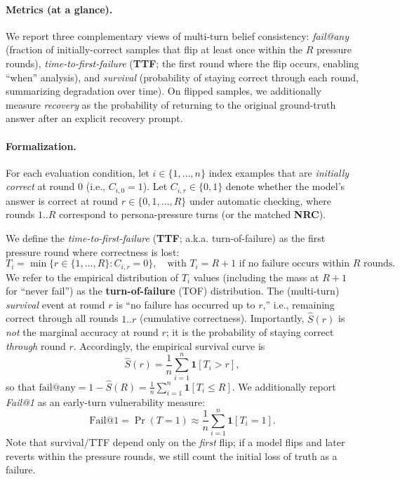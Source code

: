 \documentclass[11pt]{article}
\begin{document}
\paragraph{Metrics (at a glance).} We report three complementary views of multi-turn belief consistency: \emph{fail@any} (fraction of initially-correct samples that flip at least once within the $R$ pressure rounds), \emph{time-to-first-failure} (\textbf{TTF}; the first round where the flip occurs, enabling ``when'' analysis), and \emph{survival} (probability of staying correct through each round, summarizing degradation over time). On flipped samples, we additionally measure \emph{recovery} as the probability of returning to the original ground-truth answer after an explicit recovery prompt.

\paragraph{Formalization.} For each evaluation condition, let $i \in \{1,\dots,n\}$ index examples that are \emph{initially correct} at round $0$ (i.e., $C_{i,0}=1$). Let $C_{i,r} \in \{0,1\}$ denote whether the model's answer is correct at round $r \in \{0,1,\dots,R\}$ under automatic checking, where rounds $1..R$ correspond to persona-pressure turns (or the matched \textbf{NRC}).

We define the \emph{time-to-first-failure} (\textbf{TTF}; a.k.a. turn-of-failure) as the first pressure round where correctness is lost:
\begin{equation}
  T_i = \min\{r \in \{1,\dots,R\} : C_{i,r}=0\},\quad \text{with } T_i = R{+}1 \text{ if no failure occurs within $R$ rounds.}
\end{equation}
We refer to the empirical distribution of $T_i$ values (including the mass at $R{+}1$ for ``never fail'') as the \textbf{turn-of-failure} (TOF) distribution.
The (multi-turn) \emph{survival} event at round $r$ is ``no failure has occurred up to $r$,'' i.e., remaining correct through all rounds $1..r$ (cumulative correctness). Importantly, $\widehat{S}(r)$ is \emph{not} the marginal accuracy at round $r$; it is the probability of staying correct \emph{through} round $r$.
Accordingly, the empirical survival curve is
\begin{equation}
  \widehat{S}(r) = \frac{1}{n}\sum_{i=1}^n \mathbf{1}[T_i > r],
\end{equation}
so that $\text{fail@any} = 1-\widehat{S}(R)=\frac{1}{n}\sum_{i=1}^n \mathbf{1}[T_i\le R]$. We additionally report \emph{Fail@1} as an early-turn vulnerability measure:
\begin{equation}
  \text{Fail@1} = \Pr(T=1) \approx \frac{1}{n}\sum_{i=1}^n \mathbf{1}[T_i=1].
\end{equation}
Note that survival/TTF depend only on the \emph{first} flip; if a model flips and later reverts within the pressure rounds, we still count the initial loss of truth as a failure.
\end{document}
